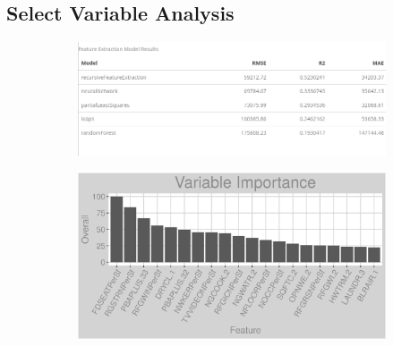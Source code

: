 \subsection{Select Variable Analysis}
\label{appendix:natural_gas:sva}
\begin{figure}[h]
\centering
\begin{subfigure}{0.8\textwidth}
\centering
\includegraphics[width=.99\textwidth, height=0.35\textheight]{Images/natural_gas_psf_fe_summary.png}
\end{subfigure}
\begin{subfigure}{1\textwidth}
\centering
\includegraphics[width=.99\textwidth, height=0.4\textheight]{Images/natural_gas_psf_all_vars.png}
\end{subfigure}
\end{figure}
\FloatBarrier
\newpage
